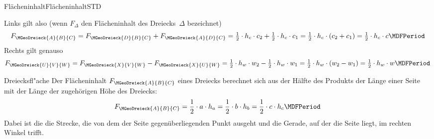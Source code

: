\begin{MXContent}{Fl\"acheninhalt}{Fl\"acheninhalt}{STD}
\begin{center}
\hspace{4em}
\end{center}

Links gilt also (wenn $F_{\Delta}$ den Fl\"acheninhalt des Dreiecks~$\Delta$ 
bezeichnet)
\[
   F_{\MGeoDreieck{A}{B}{C}}
 = F_{\MGeoDreieck{D}{B}{C}} + F_{\MGeoDreieck{A}{D}{C}}
 = \Mtfrac{1}{2} \cdot h_c \cdot c_2 + \Mtfrac{1}{2} \cdot h_c \cdot c_1
 = \Mtfrac{1}{2} \cdot h_c \cdot \left( c_2 + c_1 \right)
 = \Mtfrac{1}{2} \cdot h_c \cdot c \MDFPeriod
\]
Rechts gilt genauso
\[
   F_{\MGeoDreieck{U}{V}{W}}
 = F_{\MGeoDreieck{X}{V}{W}} - F_{\MGeoDreieck{X}{U}{W}}
 = \Mtfrac{1}{2} \cdot h_w \cdot w_2 - \Mtfrac{1}{2} \cdot h_w \cdot w_1
 = \Mtfrac{1}{2} \cdot h_w \cdot \left( w_2 - w_1 \right)
 = \Mtfrac{1}{2} \cdot h_w \cdot w \MDFPeriod
\]

\begin{MXInfo}{Dreiecksfl"ache}
Der Fl\"acheninhalt $F_{\MGeoDreieck{A}{B}{C}}$ eines Dreiecks berechnet sich 
aus der H\"alfte des Produkts
der L\"ange einer Seite mit der L\"ange der zugeh\"origen H\"ohe des Dreiecks:
       \[
          F_{\MGeoDreieck{A}{B}{C}}
        = \frac{1}{2} \cdot a \cdot h_a
        = \frac{1}{2} \cdot b \cdot h_b
        = \frac{1}{2} \cdot c \cdot h_c \MDFPeriod
       \]
Dabei ist die 
die Strecke, die von dem der Seite gegen\"uberliegenden Punkt ausgeht 
und die Gerade, auf der die Seite liegt, im rechten Winkel trifft. 
\end{MXInfo}



\end{MXContent}
